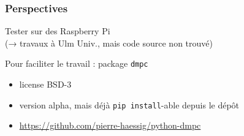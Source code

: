 \begin{frame}[c]
  \frametitle{Perspectives}
  
  Tester sur des Raspberry Pi\\ (→ travaux à Ulm Univ., mais code source non trouvé)
  

  \bigskip
  
  Pour faciliter le travail :
  package \texttt{dmpc} 
  
  \begin{itemize}
   \item license BSD-3
   \item version alpha, mais déjà \texttt{pip install}-able depuis le dépôt
   \item \url{https://github.com/pierre-haessig/python-dmpc}
  \end{itemize}
  
\end{frame}




